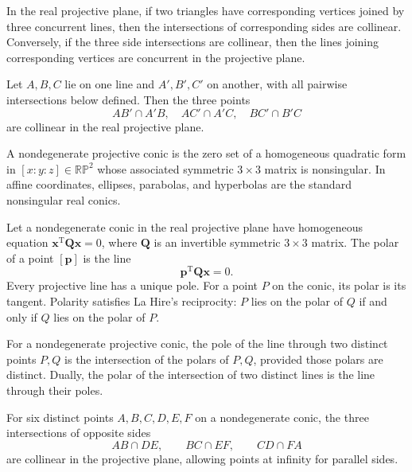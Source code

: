 \begin{theorem}
In the real projective plane, if two triangles have corresponding vertices joined by three concurrent lines, then the intersections of corresponding sides are collinear. Conversely, if the three side intersections are collinear, then the lines joining corresponding vertices are concurrent in the projective plane.
\end{theorem}

\begin{theorem}
Let $A, B, C$ lie on one line and $A', B', C'$ on another, with all pairwise intersections below defined. Then the three points
\[
 AB'\cap A'B, \quad AC'\cap A'C, \quad BC'\cap B'C
\]
are collinear in the real projective plane.
\end{theorem}

\begin{definition}
A nondegenerate projective conic is the zero set of a homogeneous quadratic form in $[x:y:z]\in\mathbb{RP}^2$ whose associated symmetric $3\times3$ matrix is nonsingular. In affine coordinates, ellipses, parabolas, and hyperbolas are the standard nonsingular real conics.
\end{definition}

\begin{definition}
Let a nondegenerate conic in the real projective plane have homogeneous equation $\mathbf{x}^{\mathrm{T}}\mathbf{Q}\mathbf{x}=0$, where $\mathbf{Q}$ is an invertible symmetric $3\times3$ matrix. The polar of a point $[\mathbf{p}]$ is the line
\[
 \mathbf{p}^{\mathrm{T}}\mathbf{Q}\mathbf{x}=0.
\]
Every projective line has a unique pole. For a point $P$ on the conic, its polar is its tangent. Polarity satisfies La Hire's reciprocity: $P$ lies on the polar of $Q$ if and only if $Q$ lies on the polar of $P$.
\end{definition}

\begin{theorem}
For a nondegenerate projective conic, the pole of the line through two distinct points $P,Q$ is the intersection of the polars of $P,Q$, provided those polars are distinct. Dually, the polar of the intersection of two distinct lines is the line through their poles.
\end{theorem}

\begin{theorem}
For six distinct points $A, B, C, D, E, F$ on a nondegenerate conic, the three intersections of opposite sides
\[
 AB\cap DE, \qquad BC\cap EF, \qquad CD\cap FA
\]
are collinear in the projective plane, allowing points at infinity for parallel sides.
\end{theorem}

